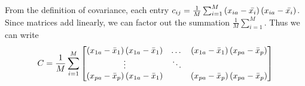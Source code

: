 \documentclass[12pt]{extarticle}
\begin{document}
        From the definition of covariance, each entry $c_{ij} = \frac{1}{M} \sum _{i=1}^M \left( x_{ia} - \bar{x_i}\right) \left(x_{ia} - \bar{x_i}\right)$. Since matrices add linearly, we can factor out the summation $\frac{1}{M} \sum_{i=1}^M$. Thus we can write
            \[
                C = \frac{1}{M} \sum_{i=1}^M \begin{bmatrix}
                    \left(x_{1a} - \bar{x}_1\right) \left(x_{1a} - \bar{x}_1\right) & \dotsc  & \left(x_{1a} - \bar{x}_1\right) \left(x_{pa} - \bar{x}_p\right) \\
                    \vdots & \ddots & \\
                    \left(x_{pa} - \bar{x}_p\right) \left(x_{1a} - \bar{x}_1\right) &  & \left(x_{pa} - \bar{x}_p\right) \left(x_{pa} - \bar{x}_p\right)
                \end{bmatrix}
            \] 
        
\end{document}
